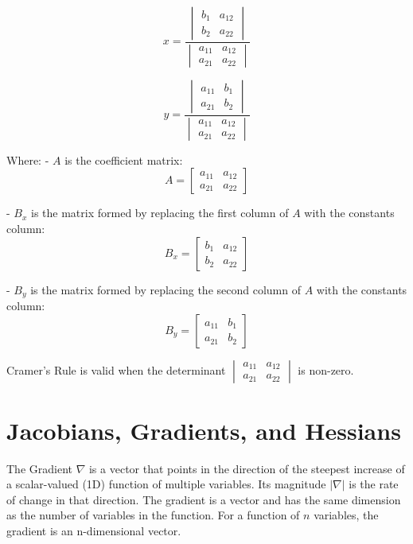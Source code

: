 \documentclass[11pt,a4paper]{book}
\theoremstyle{definition}\newtheorem{definition}{Definition}
\theoremstyle{definition}\newtheorem{fact}{Fact}
\theoremstyle{definition}\newtheorem{remark}{Remark}
\theoremstyle{definition}\newtheorem{ex}{Ex.}
\theoremstyle{definition}\newtheorem{project}{Project}
\theoremstyle{definition}\newtheorem{problem}{Problem}
\theoremstyle{definition}\newtheorem{example}{Example}
\numberwithin{theorem}{section}
\numberwithin{corollary}{chapter}
\numberwithin{assumption}{chapter}
\numberwithin{definition}{chapter}
\numberwithin{prop}{chapter}
\numberwithin{notation}{chapter}
\numberwithin{problem}{chapter}
\numberwithin{example}{chapter}
\numberwithin{fact}{chapter}
\numberwithin{ex}{chapter}
\begin{document}
\begin{appendices}
	\[
	x = \frac{\begin{vmatrix}
			b_1 & a_{12} \\
			b_2 & a_{22}
	\end{vmatrix}}{\begin{vmatrix}
			a_{11} & a_{12} \\
			a_{21} & a_{22}
	\end{vmatrix}}
	\]
	
	\[
	y = \frac{\begin{vmatrix}
			a_{11} & b_1 \\
			a_{21} & b_2
	\end{vmatrix}}{\begin{vmatrix}
			a_{11} & a_{12} \\
			a_{21} & a_{22}
	\end{vmatrix}}
	\]
	
	Where:
	- \(A\) is the coefficient matrix:
	\[
	A = \begin{bmatrix}
		a_{11} & a_{12} \\
		a_{21} & a_{22}
	\end{bmatrix}
	\]
	
	- \(B_x\) is the matrix formed by replacing the first column of \(A\) with the constants column:
$$
	B_x = \begin{bmatrix}
		b_1 & a_{12} \\
		b_2 & a_{22}
	\end{bmatrix}
$$
	
	- \(B_y\) is the matrix formed by replacing the second column of \(A\) with the constants column:
	\[
	B_y = \begin{bmatrix}
		a_{11} & b_1 \\
		a_{21} & b_2
	\end{bmatrix}
	\]
	
	Cramer's Rule is valid when the determinant \(\begin{vmatrix}
		a_{11} & a_{12} \\
		a_{21} & a_{22}
	\end{vmatrix}\) is non-zero.
	
	
	\section{Jacobians, Gradients, and Hessians}
	The Gradient $\nabla$ is a vector that points in the direction of the steepest increase of a scalar-valued (1D) function of multiple variables. Its magnitude $|\nabla |$ is the rate of change in that direction. The gradient is a vector and has the same dimension as the number of variables in the function. For a function of $n$ variables, the gradient is an n-dimensional vector.
	

\end{appendices}
\end{document}
